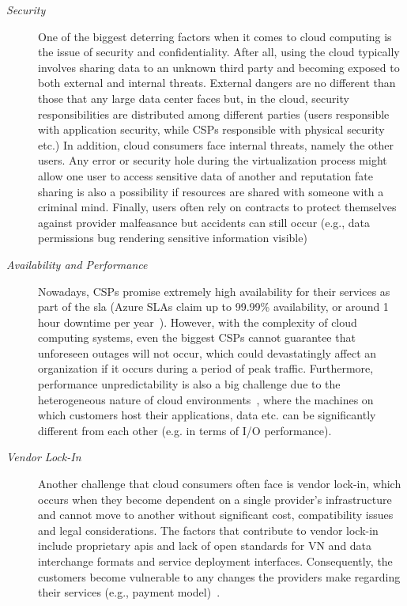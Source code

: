 \begin{description}
    \item [\textit{Security}] One of the biggest deterring factors when it comes to cloud computing is the issue of security and confidentiality. After all, using the cloud typically involves sharing data to an unknown third party and becoming exposed to both external and internal threats. External dangers are no different than those that any large data center faces but, in the cloud, security responsibilities are distributed among different parties (users responsible with application security, while CSPs responsible with physical security etc.) In addition, cloud consumers face internal threats, namely the other users. Any error or security hole during the virtualization process might allow one user to access sensitive data of another and reputation fate sharing is also a possibility if resources are shared with someone with a criminal mind. Finally, users often rely on contracts to protect themselves against provider malfeasance but accidents can still occur (e.g., data permissions bug rendering sensitive information visible)

    \item[\textit{Availability and Performance}] Nowadays, CSPs promise extremely high availability for their services as part of the \ac{sla} (Azure SLAs claim up to 99.99\% availability, or around 1 hour downtime per year~\cite{availability}). However, with the complexity of cloud computing systems,  even the biggest CSPs cannot guarantee that unforeseen outages will not occur, which could devastatingly affect an organization if it occurs during a period of peak traffic. Furthermore, performance unpredictability is also a big challenge due to the heterogeneous nature of cloud environments~\cite{performance}, where the machines on which customers host their applications, data etc. can be significantly different from each other (e.g. in terms of I/O performance).

    \item[\textit{Vendor Lock-In}]  Another challenge that cloud consumers often face is vendor lock-in,  which occurs when they become dependent on a single provider's infrastructure and cannot move to another without significant cost, compatibility issues and legal considerations. The factors that contribute to vendor lock-in include proprietary \acp{api} and lack of open standards for VN and data interchange formats and service deployment interfaces. Consequently, the customers become vulnerable to any changes the providers make regarding their services (e.g., payment model)~\cite{lock-in}.


\end{description}
